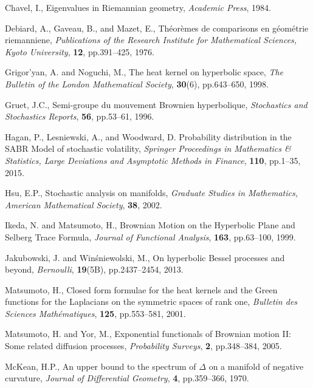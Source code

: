 \documentclass[12pt, reqno]{amsart}
\numberwithin{equation}{section}
\begin{document}
\begin{thebibliography}{19}

{\sc Chavel, I.},
{Eigenvalues in Riemannian geometry},
{\em Academic Press}, 1984.

{\sc Debiard, A.}, {\sc Gaveau, B.}, and {\sc Mazet, E.},
{Th\'eor\`emes de comparisons en g\'eom\'etrie riemanniene},
{\em Publications of the Research Institute for Mathematical Sciences, Kyoto University}, {\bf 12}, pp.391--425, 1976.

{\sc Grigor'yan, A.} and {\sc Noguchi, M.},
{The heat kernel on hyperbolic space},
{\em The Bulletin of the London Mathematical Society}, {\bf 30}(6), pp.643--650, 1998.

{\sc Gruet, J.C.},
{Semi-groupe du mouvement Brownien hyperbolique},
{\em Stochastics and Stochastics Reports}, {\bf 56}, pp.53--61, 1996.

{\sc Hagan, P.}, {\sc Lesniewski, A.}, and {\sc Woodward, D.}
{Probability distribution in the SABR Model of stochastic volatility},
{\em Springer Proceedings in Mathematics \& Statistics,
Large Deviations and Asymptotic Methods in Finance}, {\bf 110}, pp.1--35, 2015.

{\sc Hsu, E.P.},
{Stochastic analysis on manifolds},
{\em Graduate Studies in Mathematics, American Mathematical Society}, {\bf 38}, 2002.

{\sc Ikeda, N.} and {\sc Matsumoto, H.},
{Brownian Motion on the Hyperbolic Plane and Selberg Trace Formula},
{\em Journal of Functional Analysis}, {\bf 163}, pp.63--100, 1999.

{\sc Jakubowski, J.} and {\sc Win\'sniewolski, M.},
{On hyperbolic Bessel processes and beyond},
{\em Bernoulli}, {\bf 19}(5B), pp.2437--2454, 2013.

{\sc Matsumoto, H.},
{Closed form formulae for the heat kernels and the Green functions for the Laplacians on the symmetric spaces of rank one},
{\em Bulletin des Sciences Math\'ematiques}, {\bf 125}, pp.553--581, 2001.

{\sc Matsumoto, H.} and {\sc  Yor, M.},
{Exponential functionals of Brownian motion II: Some related diffusion processes},
{\em Probability Surveys}, {\bf 2}, pp.348--384, 2005.

{\sc McKean, H.P.},
{An upper bound to the spectrum of $\Delta$ on a manifold of negative curvature},
{\em Journal of Differential Geometry}, {\bf 4}, pp.359--366, 1970.


\end{thebibliography}
\end{document}
